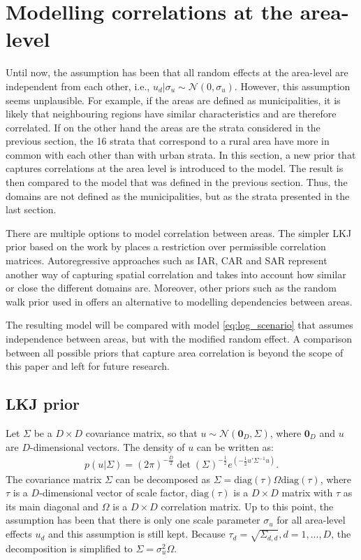 \section{Modelling correlations at the area-level}
\label{ch:area_corr}

Until now, the assumption has been that all random effects at the area-level are independent from each other, i.e., $u_d|\sigma_u \sim \mathcal N (0, \sigma_u)$.
However, this assumption seems unplausible.
For example, if the areas are defined as municipalities, it is likely that neighbouring regions have similar characteristics and are therefore correlated.
If on the other hand the areas are the strata considered in the previous section, the 16 strata that correspond to a rural area have more in common with each other than with urban strata.
In this section, a new prior that captures correlations at the area level is introduced to the model.
The result is then compared to the model that was defined in the previous section.
Thus, the domains are not defined as the municipalities, but as the strata presented in the last section.

There are multiple options to model correlation between areas.
The simpler LKJ prior based on the work by \cite{lewandowski_generating_2009} places a restriction over permissible correlation matrices.
Autoregressive approaches such as IAR, CAR and SAR \citep{chung_bayesian_2020} represent another way of capturing spatial correlation and takes into account how similar or close the different domains are.
Moreover, other priors such as the random walk prior used in \cite{gao_improving_2021} offers an alternative to modelling dependencies between areas.

The resulting model will be compared with model \ref{eq:log_scenario} that assumes independence between areas, but with the modified random effect.
A comparison between all possible priors that capture area correlation is beyond the scope of this paper and left for future research.

\subsection{LKJ prior}

Let $\Sigma$ be a $D \times D$ covariance matrix, so that $u \sim \mathcal{N}(\boldsymbol{0}_D, \Sigma)$, where $\boldsymbol 0_D$ and $u$ are $D$-dimensional vectors.
The density of $u$ can be written as:
\begin{gather*}
    p(u|\Sigma) = (2\pi)^{-\frac D 2}\det(\Sigma)^{-\frac 1 2} e^{(-\frac 1 2 u'\Sigma^{-1} u)}.
\end{gather*}
The covariance matrix $\Sigma$ can be decomposed as $\Sigma = \text{diag}(\tau)\Omega\text{diag}(\tau)$, where $\tau$ is a $D$-dimensional vector of scale factor, $\text{diag}(\tau)$ is a $D \times D$ matrix with $\tau$ as its main diagonal and $\Omega$ is a $D \times D$ correlation matrix.
Up to this point, the assumption has been that there is only one scale parameter $\sigma_u$ for all area-level effects $u_d$ and this assumption is still kept.
Because $\tau_d = \sqrt{\Sigma_{d, d}}, d = 1, ..., D$, the decomposition is simplified to $\Sigma = \sigma_u^2 \Omega$.

